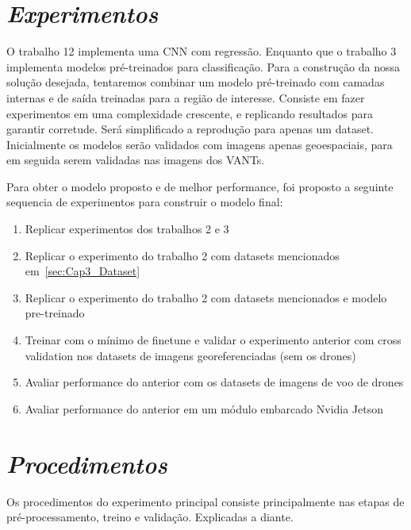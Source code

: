 \section{\textit{Experimentos}}\label{sec:Cap3_Experimentos}

O trabalho 12 implementa uma CNN com regressão. Enquanto que o trabalho 3 implementa modelos pré-treinados para classificação. Para a construção da nossa solução desejada, tentaremos combinar um modelo pré-treinado com camadas internas e de saída treinadas para a região de interesse.
Consiste em fazer experimentos em uma complexidade crescente, e replicando resultados para garantir corretude. Será simplificado a reprodução para apenas um dataset.
Inicialmente os modelos serão validados com imagens apenas geoespaciais, para em seguida serem validadas nas imagens dos VANTs.

Para obter o modelo proposto e de melhor performance, foi proposto a seguinte sequencia de experimentos para construir o modelo final:
\begin{enumerate}
\item  Replicar experimentos dos trabalhos 2 e 3
\item  Replicar o experimento do trabalho 2 com datasets mencionados em~\ref{sec:Cap3_Dataset}
\item  Replicar o experimento do trabalho 2 com datasets mencionados e modelo pre-treinado
\item Treinar com o mínimo de finetune e validar o experimento anterior com cross validation nos datasets de imagens georeferenciadas (sem os drones)
\item Avaliar performance do anterior com os datasets de imagens de voo de drones
\item Avaliar performance do anterior em um módulo embarcado Nvidia Jetson
\end{enumerate}


    

\section{\textit{Procedimentos}}\label{sec:Cap3_Procedimentos}

Os procedimentos do experimento principal consiste principalmente nas etapas de 
pré-processamento, treino e validação. Explicadas a diante.


